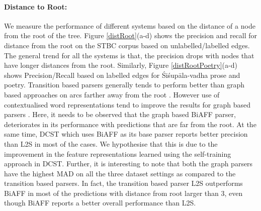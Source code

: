 \documentclass[11pt]{article}
\begin{document}
\paragraph{Distance to Root:}We measure the performance of different systems based on the distance of a node from the root of the tree. Figure \ref{distRoot}(a-d) shows the precision and recall for distance from the root on the STBC corpus based on  unlabelled/labelled edges.  The general trend for all the systems is that, the precision drops with nodes that have longer distances from the root. Similarly, Figure \ref{distRootPoetry}(a-d) shows Precision/Recall based on labelled edges for Śiśupāla-vadha prose and poetry. Transition based parsers generally tends to perform better than graph based approaches on arcs farther away from the root \cite{mcdonald-nivre-2011-analyzing}. However use of contextualised word representations tend to improve the results for graph based parsers \cite{kulmizev-etal-2019-deep}. Here, it needs to be observed that the graph based BiAFF parser, deteriorates in its performance with predictions that are far from the root. At the same time, DCST which uses BiAFF as its base parser reports better precision than L2S in most of the cases. We hypothesise that this is due to the improvement in the feature representations learned using the self-training approach in DCST. Further, it is interesting to note that both the graph parsers have the highest MAD on all the three dataset settings as compared to the transition based parsers. In fact, the transition based parser L2S outperforms BiAFF in most of the predictions with distance from root larger than 3, even though BiAFF  reports a better overall performance than L2S. 




\end{document}
